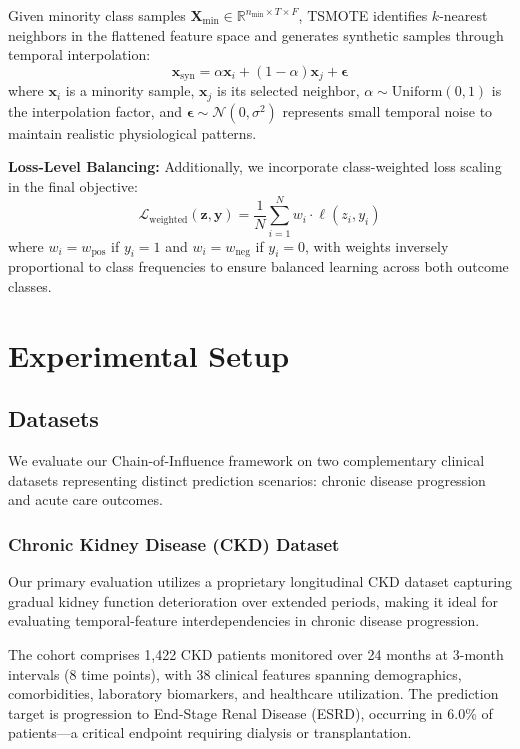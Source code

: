 \documentclass[letterpaper]{article}
\begin{document}
\begin{enumerate}
Given minority class samples $\mathbf{X}_{\text{min}} \in \mathbb{R}^{n_{\text{min}} \times T \times F}$, TSMOTE identifies $k$-nearest neighbors in the flattened feature space and generates synthetic samples through temporal interpolation:
$$\mathbf{x}_{\text{syn}} = \alpha \mathbf{x}_i + (1-\alpha) \mathbf{x}_j + \boldsymbol{\epsilon}$$
where $\mathbf{x}_i$ is a minority sample, $\mathbf{x}_j$ is its selected neighbor, $\alpha \sim \text{Uniform}(0,1)$ is the interpolation factor, and $\boldsymbol{\epsilon} \sim \mathcal{N}(0, \sigma^2)$ represents small temporal noise to maintain realistic physiological patterns.

\textbf{Loss-Level Balancing:} Additionally, we incorporate class-weighted loss scaling in the final objective:
$$\mathcal{L}_{\text{weighted}}(\mathbf{z}, \mathbf{y}) = \frac{1}{N} \sum_{i=1}^{N} w_i \cdot \ell(z_i, y_i)$$
where $w_i = w_{\text{pos}}$ if $y_i = 1$ and $w_i = w_{\text{neg}}$ if $y_i = 0$, with weights inversely proportional to class frequencies to ensure balanced learning across both outcome classes.

\section{Experimental Setup}

\subsection{Datasets}

We evaluate our Chain-of-Influence framework on two complementary clinical datasets representing distinct prediction scenarios: chronic disease progression and acute care outcomes.

\subsubsection{Chronic Kidney Disease (CKD) Dataset}

Our primary evaluation utilizes a proprietary longitudinal CKD dataset capturing gradual kidney function deterioration over extended periods, making it ideal for evaluating temporal-feature interdependencies in chronic disease progression.

The cohort comprises 1,422 CKD patients monitored over 24 months at 3-month intervals (8 time points), with 38 clinical features spanning demographics, comorbidities, laboratory biomarkers, and healthcare utilization. The prediction target is progression to End-Stage Renal Disease (ESRD), occurring in 6.0\% of patients—a critical endpoint requiring dialysis or transplantation.


\end{enumerate}
\end{document}
